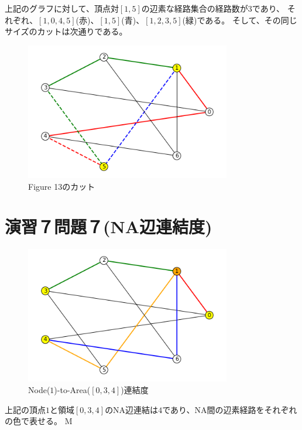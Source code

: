 \documentclass{report}
\begin{document}
\begin{CJK}{UTF8}{min}
    上記のグラフに対して、頂点対$[1,5]$の辺素な経路集合の経路数が$3$であり、
    それぞれ、$[1,0,4,5]$(赤)、$[1,5]$(青)、$[1,2,3,5]$(緑)である。
    そして、その同じサイズのカットは次通りである。
    \begin{figure}[!h]
        \centerline{\includegraphics[width=0.8\textwidth]{data/14.png}}
        \caption{Figure 13のカット}
    \end{figure}


    \clearpage
    \section*{演習７問題７(NA辺連結度)}
    \begin{figure}[!h]
        \centerline{\includegraphics[width=0.8\textwidth]{data/15.png}}
        \caption{Node($1$)-to-Area($[ 0,3,4 ]$)連結度}
    \end{figure}
    上記の頂点$1$と領域$[0,3,4]$のNA辺連結は$4$であり、NA間の辺素経路をそれぞれの色で表せる。
    M
    \clearpage

\end{CJK}
\end{document}
